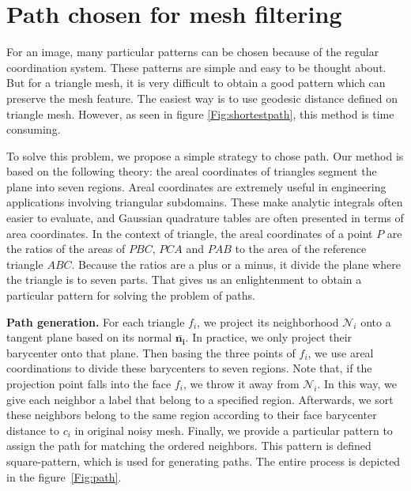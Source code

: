  \section{Path chosen for mesh filtering}
 \label{Sec:path}


 For an image, many particular patterns can be chosen because of the regular coordination system.
 These patterns are simple and easy to be thought about.
 But for a triangle mesh, it is very difficult to obtain a good pattern which can preserve the mesh feature.
 The easiest way is to use geodesic distance defined on triangle mesh.%
 However, as seen in figure \ref{Fig:shortestpath}, this method is time consuming.

To solve this problem, we propose a simple strategy to chose path.
 Our method is based on the following theory: the areal coordinates of triangles segment the plane into seven regions.
 Areal coordinates are extremely useful in engineering applications involving triangular subdomains.
 These make analytic integrals often easier to evaluate, and Gaussian quadrature tables are often presented in terms of area coordinates.
 In the context of triangle, the areal coordinates of a point $P$ are the ratios of the areas of $PBC$, $PCA$ and $PAB$ to the area of the reference triangle $ABC$.
 Because the ratios are a plus or a minus, it divide the plane where the triangle is to seven parts.
 That gives us an enlightenment to obtain a particular pattern for solving the problem of paths.

{\bfseries Path generation.}
For each triangle $f_i$, we project its neighborhood $\mathcal{N}_i$ onto a tangent plane based on its normal $\mathbf{\bar{n_i}}$.
In practice, we only project their barycenter onto that plane.
Then basing the three points of $f_i$, we use areal coordinations to divide these barycenters to seven regions.
Note that, if the projection point falls into the face $f_i$, we throw it away from $\mathcal{N}_i$.
In this way, we give each neighbor a label that belong to a specified region.
Afterwards, we sort these neighbors belong to the same region according to their face barycenter distance to $c_i$ in original noisy mesh.
Finally, we provide a particular pattern to assign the path for matching the ordered neighbors.
This pattern is defined square-pattern, which is used for generating paths.
The entire process is depicted in the figure~\ref{Fig:path}.

